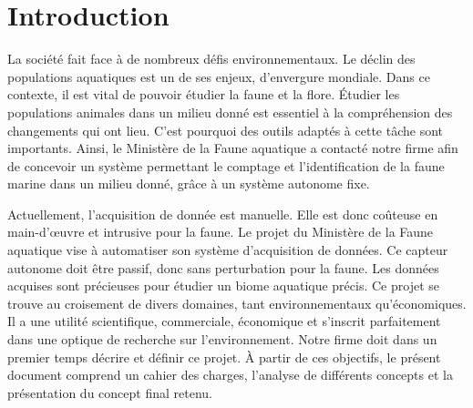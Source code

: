 
%
%

\chapter{Introduction}
\label{s:intro}

La société fait face à de nombreux défis environnementaux. Le déclin des populations aquatiques est un de ses enjeux, d’envergure mondiale.
Dans ce contexte, il est vital de pouvoir étudier la faune et la flore.
Étudier les populations animales dans un milieu donné est essentiel à la compréhension des changements qui ont lieu.
C’est pourquoi des outils adaptés à cette tâche sont importants.
\wl
Ainsi, le Ministère de la Faune aquatique a contacté notre firme afin de concevoir un système permettant le comptage et l’identification de la faune marine dans un milieu donné, grâce à un système autonome fixe.

Actuellement, l’acquisition de donnée est manuelle.
Elle est donc coûteuse en main-d’œuvre et intrusive pour la faune.
Le projet du Ministère de la Faune aquatique vise à automatiser son système d’acquisition de données.
Ce capteur autonome doit être passif, donc sans perturbation pour la faune.
Les données acquises sont précieuses pour étudier un biome aquatique précis.
\wl
Ce projet se trouve au croisement de divers domaines, tant environnementaux qu’économiques.
Il a une utilité scientifique, commerciale, économique et s’inscrit parfaitement dans une optique de recherche sur l’environnement.
\wl
Notre firme doit dans un premier temps décrire et définir ce projet.
À partir de ces objectifs, le présent document comprend un cahier des charges, l’analyse de différents concepts et la présentation du concept final retenu.